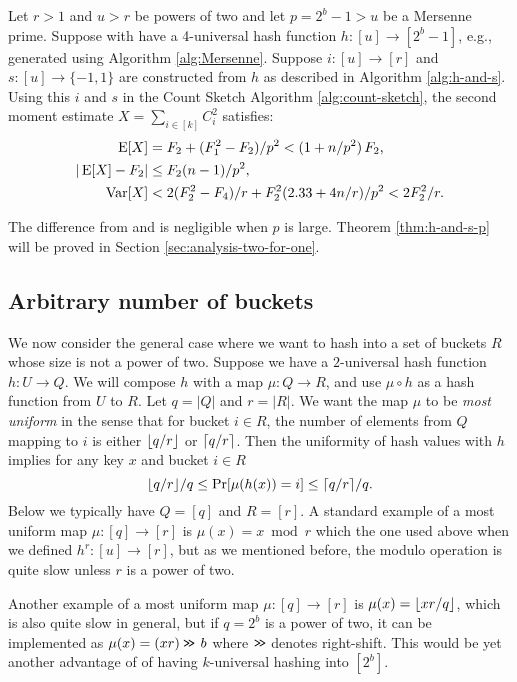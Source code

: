 \begin{theorem}\label{thm:h-and-s-p}
   Let $r>1$ and $u>r$ be powers of two and let $p=2^b-1>u$ be a
   Mersenne prime.
   Suppose with have a 4-universal hash function $h:[u]\to[2^b-1]$, e.g.,
   generated using Algorithm \ref{alg:Mersenne}. Suppose
   $i:[u]\to[r]$ and
   $s:[u]\to\{-1,1\}$ are constructed from $h$ as described in
   Algorithm \ref{alg:h-and-s}. Using this $i$ and $s$ 
   in the Count Sketch Algorithm \ref{alg:count-sketch}, the second moment 
   estimate $X=\sum_{i\in[k]} C_i^2$ satisfies:
   \begin{align}
      \operatorname*{E}[X]&=F_2+(F_1^2-F_2)/p^2 < (1+n/p^2)\,F_2\textnormal,\label{eq:E-F2-p}\\
      | \operatorname*{E}[X] - F_2 | &\le F_2 (n - 1)/p^2, \label{eq:E-F2-p-com}\\
      \operatorname*{Var}[X]&< 2(F_2^2-F_4)/r+F_2^2 (2.33+4 n/r)/p^2<2F_2^2/r.\label{eq:V-F2-p}
   \end{align}
\end{theorem}
The difference from  and  
is negligible when $p$ is large. Theorem \ref{thm:h-and-s-p} will be
proved in Section \ref{sec:analysis-two-for-one}.


\subsection{Arbitrary number of buckets}\label{sec:most-uniform}
We now consider the general case where we want to hash into a set of buckets $R$ whose size is not a power of two.
Suppose we have a $2$-universal hash function $h:U\to Q$.
We will compose $h$ with a map $\mu:Q\to R$, and use $\mu\circ h$ as a hash function from $U$ to $R$.
Let $q=|Q|$ and $r=|R|$.
We want the map $\mu$ to be \emph{most uniform} in the sense that for bucket $i\in R$, the number of elements from $Q$ mapping to $i$ is either $\lfloor {q/r} \rfloor$ or $\lceil {q/r}\rceil$.
Then the uniformity of hash values with $h$ implies for any key $x$ and bucket $i\in R$ \[\lfloor {q/r} \rfloor/q\leq \Pr[\mu(h(x))=i]\leq \lceil {q/r}\rceil/q.\]
Below we typically have $Q=[q]$ and $R=[r]$.
A standard example of a most uniform map $\mu:[q]\to[r]$ is $\mu(x)=x\bmod r$ which the one used above when we defined $h^r:[u]\to[r]$, but as we mentioned before, the modulo operation is quite slow unless $r$ is a power of two.

Another example of a most uniform map $\mu:[q]\to[r]$ 
is $\mu(x)=\lfloor {xr/q} \rfloor$,
which is also quite slow in general, but if $q=2^b$ is a power of two,
it can be implemented as $\mu(x)=(xr)\mathbin{\texttt{>\!>}}\,b$ where 
$\mathbin{\texttt{>\!>}}$ denotes right-shift. This would be yet another advantage 
of of having $k$-universal hashing into $[2^b]$.


